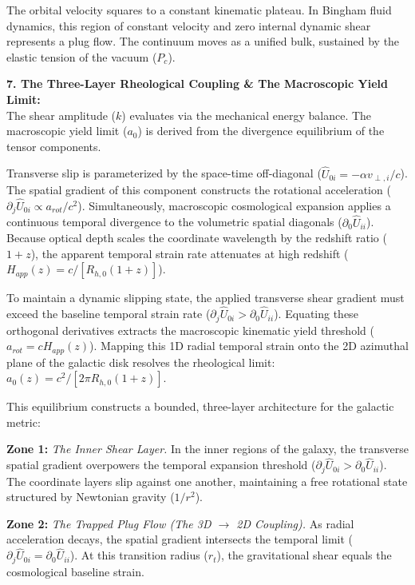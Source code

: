 The orbital velocity squares to a constant kinematic plateau. In Bingham fluid dynamics, this region of constant velocity and zero internal dynamic shear represents a plug flow. The continuum moves as a unified bulk, sustained by the elastic tension of the vacuum ($P_c$). 

\textbf{7. The Three-Layer Rheological Coupling \& The Macroscopic Yield Limit:} \\ 
The shear amplitude ($k$) evaluates via the mechanical energy balance. The macroscopic yield limit ($a_0$) is derived from the divergence equilibrium of the tensor components. 

Transverse slip is parameterized by the space-time off-diagonal ($\hat{U}_{0i} = -\alpha v_{\perp,i}/c$). The spatial gradient of this component constructs the rotational acceleration ($\partial_j \hat{U}_{0i} \propto a_{rot}/c^2$). 
Simultaneously, macroscopic cosmological expansion applies a continuous temporal divergence to the volumetric spatial diagonals ($\partial_0 \hat{U}_{ii}$). Because optical depth scales the coordinate wavelength by the redshift ratio ($1+z$), the apparent temporal strain rate attenuates at high redshift ($H_{app}(z) = c/[R_{h,0}(1+z)]$). 

To maintain a dynamic slipping state, the applied transverse shear gradient must exceed the baseline temporal strain rate ($\partial_j \hat{U}_{0i} > \partial_0 \hat{U}_{ii}$). 
Equating these orthogonal derivatives extracts the macroscopic kinematic yield threshold ($a_{rot} = c H_{app}(z)$). Mapping this 1D radial temporal strain onto the 2D azimuthal plane of the galactic disk resolves the rheological limit: $a_0(z) = c^2 / [2\pi R_{h,0} (1+z)]$. 

This equilibrium constructs a bounded, three-layer architecture for the galactic metric: 

\textbf{Zone 1:}  \textit{The Inner Shear Layer.} 
In the inner regions of the galaxy, the transverse spatial gradient overpowers the temporal expansion threshold ($\partial_j \hat{U}_{0i} > \partial_0 \hat{U}_{ii}$). The coordinate layers slip against one another, maintaining a free rotational state structured by Newtonian gravity ($1/r^2$). 

\textbf{Zone 2:}  \textit{The Trapped Plug Flow (The 3D $\rightarrow$ 2D Coupling).} 
As radial acceleration decays, the spatial gradient intersects the temporal limit ($\partial_j \hat{U}_{0i} = \partial_0 \hat{U}_{ii}$). At this transition radius ($r_t$), the gravitational shear equals the cosmological baseline strain. 

